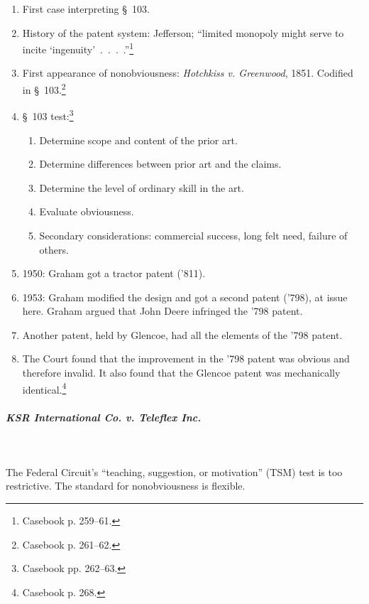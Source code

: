 \begin{enumerate}
    \item First case interpreting \S\ 103.
    \item History of the patent system: Jefferson; \enquote{limited monopoly 
    might serve to incite \enquote{ingenuity}~.~.~.~.}\footnote{Casebook p. 
    259--61.}
    \item First appearance of nonobviousness: \emph{Hotchkiss v. Greenwood}, 
    1851. Codified in \S\ 103.\footnote{Casebook p. 261--62.}
    \item \S\ 103 test:\footnote{Casebook pp. 262--63.}
    \begin{enumerate}
        \item Determine scope and content of the prior art.
        \item Determine differences between prior art and the claims.
        \item Determine the level of ordinary skill in the art.
        \item Evaluate obviousness.
        \item Secondary considerations: commercial success, long felt need, 
        failure of others.
    \end{enumerate}
    \item 1950: Graham got a tractor patent ('811).
    \item 1953: Graham modified the design and got a second patent ('798), at 
    issue here. Graham argued that John Deere infringed the '798 patent.
    \item Another patent, held by Glencoe, had all the elements of the '798 
    patent.
    \item The Court found that the improvement in the '798 patent was obvious 
    and therefore invalid. It also found that the Glencoe patent was 
    mechanically identical.\footnote{Casebook p. 268.}
\end{enumerate}

\paragraph{\emph{KSR International Co. v. Teleflex Inc.}}
~\\\\
The Federal Circuit's ``teaching, suggestion, or motivation'' (TSM) test is 
too restrictive. The standard for nonobviousness is flexible.

